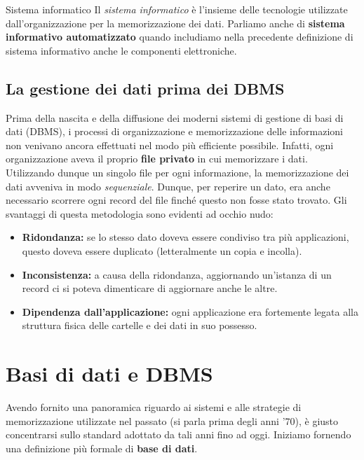 \documentclass[12pt]{report}
\begin{document}
	\begin{definizione}{Sistema informatico}{}
		Il \textit{sistema informatico} è l'insieme delle tecnologie utilizzate dall'organizzazione per la memorizzazione dei dati.
		Parliamo anche di \textbf{sistema informativo automatizzato} quando includiamo nella precedente definizione di sistema informativo anche le componenti elettroniche.
	\end{definizione}
	
	\section{La gestione dei dati prima dei DBMS}
	
	Prima della nascita e della diffusione dei moderni sistemi di gestione di basi di dati (DBMS), i processi di organizzazione e memorizzazione delle informazioni non venivano ancora effettuati nel modo più efficiente possibile. Infatti, ogni organizzazione aveva il proprio \textbf{file privato} in cui memorizzare i dati. Utilizzando dunque un singolo file per ogni informazione, la memorizzazione dei dati avveniva in modo \textit{sequenziale}. Dunque, per reperire un dato, era anche necessario scorrere ogni record del file finché questo non fosse stato trovato.
	Gli svantaggi di questa metodologia sono evidenti ad occhio nudo:
	\begin{itemize}
		\item \textbf{Ridondanza:} se lo stesso dato doveva essere condiviso tra più applicazioni, questo doveva essere duplicato (letteralmente un copia e incolla).
		
		\item \textbf{Inconsistenza:} a causa della ridondanza, aggiornando un'istanza di un record ci si poteva dimenticare di aggiornare anche le altre.
		
		\item \textbf{Dipendenza dall'applicazione:} ogni applicazione era fortemente legata alla struttura fisica delle cartelle e dei dati in suo possesso.
	\end{itemize}
	
	\chapter{Basi di dati e DBMS}
	Avendo fornito una panoramica riguardo ai sistemi e alle strategie di memorizzazione utilizzate nel passato (si parla prima degli anni '70), è giusto concentrarsi sullo standard adottato da tali anni fino ad oggi.
	Iniziamo fornendo una definizione più formale di \textbf{base di dati}.
	
\end{document}
